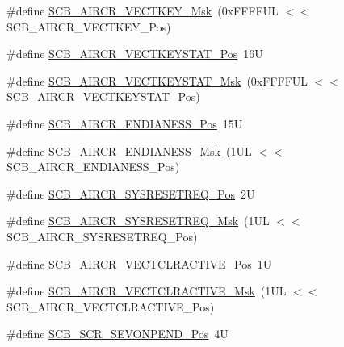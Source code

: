 \begin{DoxyCompactItemize}
\item 
\#define \hyperlink{group___c_m_s_i_s___s_c_b_ga90c7cf0c490e7ae55f9503a7fda1dd22}{S\+C\+B\+\_\+\+A\+I\+R\+C\+R\+\_\+\+V\+E\+C\+T\+K\+E\+Y\+\_\+\+Msk}~(0x\+F\+F\+F\+F\+U\+L $<$$<$ S\+C\+B\+\_\+\+A\+I\+R\+C\+R\+\_\+\+V\+E\+C\+T\+K\+E\+Y\+\_\+\+Pos)
\item 
\#define \hyperlink{group___c_m_s_i_s___s_c_b_gaec404750ff5ca07f499a3c06b62051ef}{S\+C\+B\+\_\+\+A\+I\+R\+C\+R\+\_\+\+V\+E\+C\+T\+K\+E\+Y\+S\+T\+A\+T\+\_\+\+Pos}~16U
\item 
\#define \hyperlink{group___c_m_s_i_s___s_c_b_gabacedaefeefc73d666bbe59ece904493}{S\+C\+B\+\_\+\+A\+I\+R\+C\+R\+\_\+\+V\+E\+C\+T\+K\+E\+Y\+S\+T\+A\+T\+\_\+\+Msk}~(0x\+F\+F\+F\+F\+U\+L $<$$<$ S\+C\+B\+\_\+\+A\+I\+R\+C\+R\+\_\+\+V\+E\+C\+T\+K\+E\+Y\+S\+T\+A\+T\+\_\+\+Pos)
\item 
\#define \hyperlink{group___c_m_s_i_s___s_c_b_gad31dec98fbc0d33ace63cb1f1a927923}{S\+C\+B\+\_\+\+A\+I\+R\+C\+R\+\_\+\+E\+N\+D\+I\+A\+N\+E\+S\+S\+\_\+\+Pos}~15U
\item 
\#define \hyperlink{group___c_m_s_i_s___s_c_b_ga2f571f93d3d4a6eac9a3040756d3d951}{S\+C\+B\+\_\+\+A\+I\+R\+C\+R\+\_\+\+E\+N\+D\+I\+A\+N\+E\+S\+S\+\_\+\+Msk}~(1\+U\+L $<$$<$ S\+C\+B\+\_\+\+A\+I\+R\+C\+R\+\_\+\+E\+N\+D\+I\+A\+N\+E\+S\+S\+\_\+\+Pos)
\item 
\#define \hyperlink{group___c_m_s_i_s___s_c_b_gaffb2737eca1eac0fc1c282a76a40953c}{S\+C\+B\+\_\+\+A\+I\+R\+C\+R\+\_\+\+S\+Y\+S\+R\+E\+S\+E\+T\+R\+E\+Q\+\_\+\+Pos}~2U
\item 
\#define \hyperlink{group___c_m_s_i_s___s_c_b_gaae1181119559a5bd36e62afa373fa720}{S\+C\+B\+\_\+\+A\+I\+R\+C\+R\+\_\+\+S\+Y\+S\+R\+E\+S\+E\+T\+R\+E\+Q\+\_\+\+Msk}~(1\+U\+L $<$$<$ S\+C\+B\+\_\+\+A\+I\+R\+C\+R\+\_\+\+S\+Y\+S\+R\+E\+S\+E\+T\+R\+E\+Q\+\_\+\+Pos)
\item 
\#define \hyperlink{group___c_m_s_i_s___s_c_b_gaa30a12e892bb696e61626d71359a9029}{S\+C\+B\+\_\+\+A\+I\+R\+C\+R\+\_\+\+V\+E\+C\+T\+C\+L\+R\+A\+C\+T\+I\+V\+E\+\_\+\+Pos}~1U
\item 
\#define \hyperlink{group___c_m_s_i_s___s_c_b_ga212c5ab1c1c82c807d30d2307aa8d218}{S\+C\+B\+\_\+\+A\+I\+R\+C\+R\+\_\+\+V\+E\+C\+T\+C\+L\+R\+A\+C\+T\+I\+V\+E\+\_\+\+Msk}~(1\+U\+L $<$$<$ S\+C\+B\+\_\+\+A\+I\+R\+C\+R\+\_\+\+V\+E\+C\+T\+C\+L\+R\+A\+C\+T\+I\+V\+E\+\_\+\+Pos)
\item 
\#define \hyperlink{group___c_m_s_i_s___s_c_b_ga3bddcec40aeaf3d3a998446100fa0e44}{S\+C\+B\+\_\+\+S\+C\+R\+\_\+\+S\+E\+V\+O\+N\+P\+E\+N\+D\+\_\+\+Pos}~4U
\item 
$$
\end{DoxyCompactItemize}
